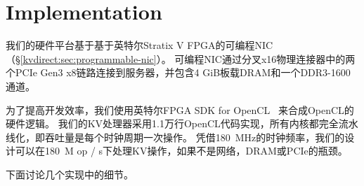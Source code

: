 \section{Implementation}
\label{kvdirect:sec:implementation}

我们的硬件平台基于基于英特尔Stratix V FPGA的可编程NIC（\S \ref {kvdirect:sec:programmable-nic}）。
可编程NIC通过分叉x16物理连接器中的两个PCIe Gen3 x8链路连接到服务器，并包含4 GiB板载DRAM和一个DDR3-1600通道。

为了提高开发效率，我们使用英特尔FPGA SDK for OpenCL~ \cite {aoc}来合成OpenCL的硬件逻辑。
我们的KV处理器采用1.1万行OpenCL代码实现，所有内核都完全流水线化，即吞吐量是每个时钟周期一次操作。
凭借180~MHz的时钟频率，我们的设计可以在180~M op / s下处理KV操作，如果不是网络，DRAM或PCIe的瓶颈。
%

下面讨论几个实现中的细节。



